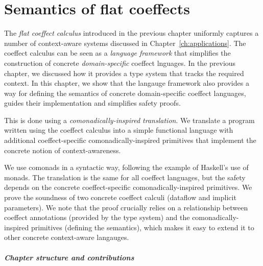 
\chapter{Semantics of flat coeffects}
\label{ch:semantics}

The \emph{flat coeffect calculus} introduced in the previous chapter uniformly captures a number
of context-aware systems discussed in Chapter~\ref{ch:applications}. The coeffect calculus 
can be seen as a \emph{language framework} that simplifies the construction of concrete 
\emph{domain-specific} coeffect lnguages. In the previous chapter, we discussed how it provides a  
type system that tracks the required context. In this chapter, we show that the langauge framework 
also provides a way for defining the semantics of concrete domain-specific coeffect languages,  
guides their implementation and simplifies safety proofs.

This is done using a \emph{comonadically-inspired translation}. We translate a program written 
using the coeffect calculus into a simple functional language with additional coeffect-specific 
comonadically-inspired primitives that implement the concrete notion of context-awareness. 

We use comonads in a syntactic way, following the example of Haskell's use of monads. The 
translation is the same for all coeffect languages, but the safety depends on the concrete
coeffect-specific comonadically-inspired primitives. We prove the soundness of two concrete
coeffect calculi (dataflow and implicit parameters). We note that the proof crucially relies on a 
relationship between coeffect annotations (provided by the type system) and the comonadically-inspired
primitives (defining the semantics), which makes it easy to extend it to other concrete 
context-aware langauges.

\paragraph{Chapter structure and contributions}


